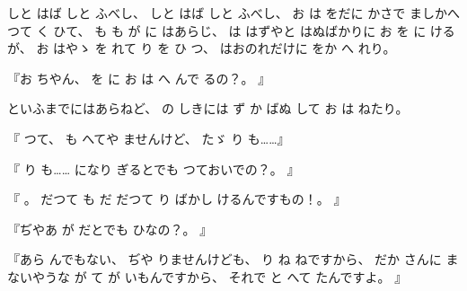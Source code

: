 
しと
はば
しと
ふべし、
%
しと
はば
しと
ふべし、
%
お
は
をだに
かさで
ましかへつて
く
ひて、
%
も
も
が
に
はあらじ、
%
は
はずやと
はぬばかりに
お
を
に
けるが、
%
お
はやゝ
を
れて
り
を
ひ
つ、
%
はおのれだけに
をか
へ
れり。

『お
ちやん、
%
を
に
お
は
へ
んで
るの？。
』

といふまでにはあらねど、
%
の
しきには
ず
か
ばぬ
して
お
は
ねたり。

『
つて、
%
も
へてや
ませんけど、
%
たゞ
り
も……』

『
り
も……
になり
ぎるとでも
つておいでの？。
』

『
。
%
だつて
も
だ
だつて
り
ばかし
けるんですもの！。
』

『ぢやあ
が
だとでも
ひなの？。
』

『あら
んでもない、
%
ぢや
りませんけども、
%
り
ね
ねですから、
%
だか
さんに
まないやうな
が
て
が
いもんですから、
%
それで
と
へて
たんですよ。
』

